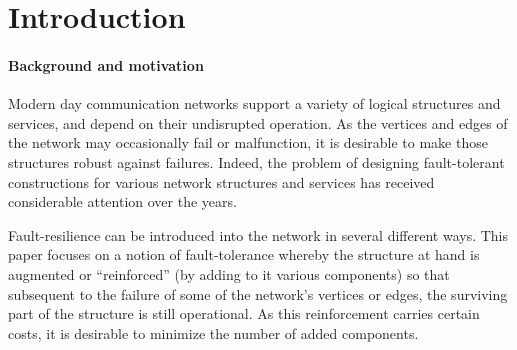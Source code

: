 \documentclass[12pt]{article}
\def\NSource{\sigma}
\def\FTMBFS{\mbox{\tt FT-MBFS}}
\def\FTBFS{\mbox{\tt FT-BFS}}
\begin{document}
\begin{abstract}
for every $n$-vertex graph and source set $S \subseteq V$ of size $\NSource$
constructs  a (single failure) \FTMBFS\ tree
$T^*(S)$ from each source $s_i \in S$, with $O(\sqrt{\NSource} \cdot n^{3/2})$
edges, and on the other hand there exist $n$-vertex graphs with source sets
$S \subseteq V$ of cardinality $\NSource$, on which any \FTMBFS\
tree from $S$ has $\Omega(\sqrt{\NSource}\cdot n^{3/2})$ edges.
\par
Finally, we propose an $O(\log n)$ approximation algorithm for constructing
\FTBFS\ and \FTMBFS\ structures. The latter is complemented by a hardness
result stating that there exists no $\Omega(\log n)$ approximation algorithm
for these problems under standard complexity assumptions. In comparison with the randomized $\FTBFS$ construction implicit in \cite{GW12},
our algorithm is deterministic  and may improve the number of edges
by a factor of up to $\sqrt{n}$ for some instances.
All our algorithms can be extended to deal with one \emph{vertex} failure as well, with the same performance.
\end{abstract}

\section{Introduction}
\paragraph{Background and motivation}
Modern day communication networks support a variety of logical structures
and services, and depend on their undisrupted operation.
As the vertices and edges of the network may occasionally fail or malfunction,
it is desirable to make those structures robust against failures.
Indeed, the problem of designing fault-tolerant constructions for various
network structures and services has received considerable attention
over the years.

Fault-resilience can be introduced into the network in several different ways.
This paper focuses on a notion of fault-tolerance whereby the structure at hand
is augmented or ``reinforced'' (by adding to it various components)
so that subsequent to the failure of some of the network's vertices or edges,
the surviving part of the structure is still operational.
As this reinforcement carries certain costs, it is desirable to minimize the number of added components.
\end{document}
